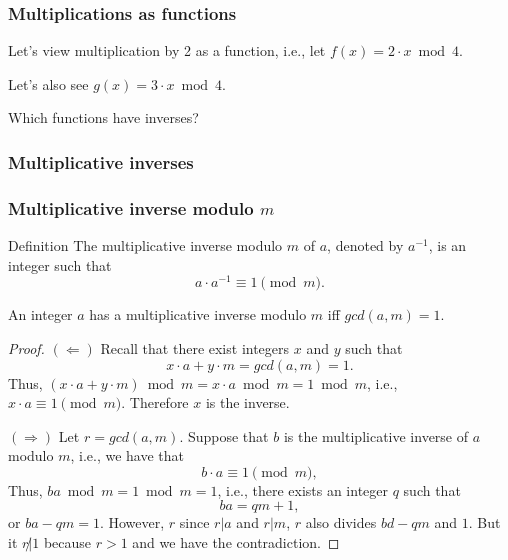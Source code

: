 \begin{frame}
  \frametitle{Multiplications as functions}

  Let's view multiplication by 2 as a function, i.e., let $f(x)=2\cdot
  x\bmod 4$.

  \vspace{1in}

  \pause
  Let's also see $g(x) = 3\cdot x \bmod 4$.

  \vspace{1in}

  \pause
  Which functions have inverses?
\end{frame}

\begin{frame}
  \frametitle{Multiplicative inverses}
  
\end{frame}

\begin{frame}
  \frametitle{Multiplicative inverse modulo $m$}

  \begin{block}{Definition}
    The multiplicative inverse modulo $m$ of $a$, denoted by $a^{-1}$,
    is an integer such that
    \[
    a\cdot a^{-1}\equiv 1 \pmod m.
    \]
  \end{block}
\end{frame}

\begin{frame}
  \begin{theorem}
    An integer $a$ has a multiplicative inverse modulo $m$ iff
    $gcd(a,m) = 1$.
  \end{theorem}
  \begin{proof}
    \pause
    {\footnotesize
    $(\Leftarrow)$ Recall that there exist integers $x$ and $y$ such
    that
    \[
    x\cdot a + y\cdot m = gcd(a,m) = 1.
    \]
    Thus,
    $(x\cdot a + y\cdot m)\bmod m = x\cdot a \bmod m = 1 \bmod m$,
    i.e., $x\cdot a\equiv 1 \pmod m$.  Therefore $x$ is the inverse.

    \pause
    $(\Rightarrow)$ Let $r=gcd(a,m)$.
    Suppose that $b$ is the multiplicative inverse of
    $a$ modulo $m$, i.e., we have that
    \[
    b\cdot a \equiv 1 \pmod m,
    \]
    Thus, $ba \bmod m = 1 \bmod m = 1$, i.e., there exists an integer
    $q$ such that
    \[
    ba = qm + 1,
    \]
    or $ba - qm = 1$.  However, $r$ since $r|a$ and $r|m$, $r$ also
    divides $bd-qm$ and $1$.  But it $r\not|1$ because $r>1$ and we
    have the contradiction.
    }
  \end{proof}
\end{frame}
